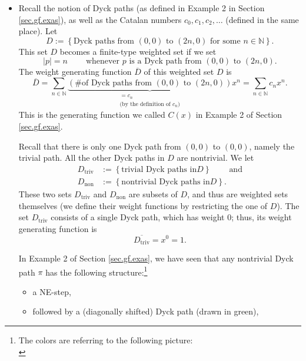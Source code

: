 \begin{itemize}
\item Recall the notion of Dyck paths (as defined in Example 2 in Section
\ref{sec.gf.exas}), as well as the Catalan numbers $c_{0},c_{1},c_{2},\ldots$
(defined in the same place). Let
\[
D:=\left\{  \text{Dyck paths from }\left(  0,0\right)  \text{ to }\left(
2n,0\right)  \text{ for some }n\in\mathbb{N}\right\}  .
\]
This set $D$ becomes a finite-type weighted set if we set
\[
\left\vert p\right\vert =n\ \ \ \ \ \ \ \ \ \ \text{whenever }p\text{ is a
Dyck path from }\left(  0,0\right)  \text{ to }\left(  2n,0\right)  .
\]
The weight generating function $\overline{D}$ of this weighted set $D$ is%
\[
\overline{D}=\sum_{n\in\mathbb{N}}\underbrace{\left(  \text{\# of Dyck paths
from }\left(  0,0\right)  \text{ to }\left(  2n,0\right)  \right)
}_{\substack{=c_{n}\\\text{(by the definition of }c_{n}\text{)}}}x^{n}%
=\sum_{n\in\mathbb{N}}c_{n}x^{n}.
\]
This is the generating function we called $C\left(  x\right)  $ in Example 2
of Section \ref{sec.gf.exas}.

Recall that there is only one Dyck path from $\left(  0,0\right)  $ to
$\left(  0,0\right)  $, namely the trivial path. All the other Dyck paths in
$D$ are nontrivial. We let%
\begin{align*}
D_{\operatorname*{triv}}  &  :=\left\{  \text{trivial Dyck paths in
}D\right\}  \ \ \ \ \ \ \ \ \ \ \text{and}\\
D_{\operatorname*{non}}  &  :=\left\{  \text{nontrivial Dyck paths in
}D\right\}  .
\end{align*}
These two sets $D_{\operatorname*{triv}}$ and $D_{\operatorname*{non}}$ are
subsets of $D$, and thus are weighted sets themselves (we define their weight
functions by restricting the one of $D$). The set $D_{\operatorname*{triv}}$
consists of a single Dyck path, which has weight $0$; thus, its weight
generating function is%
\[
\overline{D_{\operatorname*{triv}}}=x^{0}=1.
\]


In Example 2 of Section \ref{sec.gf.exas}, we have seen that any nontrivial
Dyck path $\pi$ has the following structure:\footnote{The colors are referring
to the following picture:%
\[%
\]
}

\begin{itemize}
\item a NE-step,

\item followed by a (diagonally shifted) Dyck path (drawn in green),


\end{itemize}
\end{itemize}
